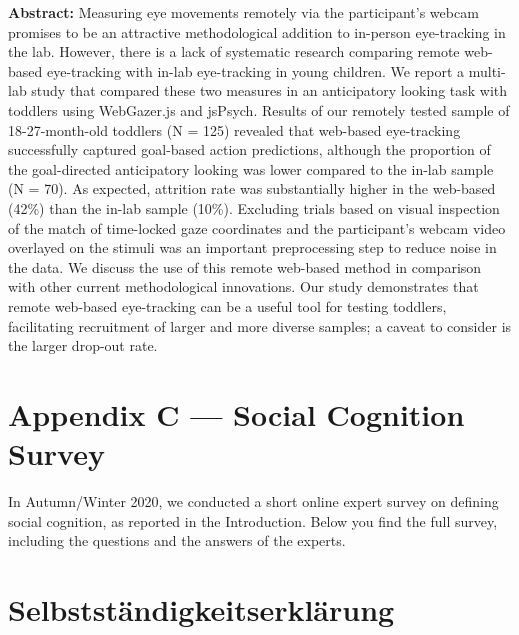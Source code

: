 \documentclass[
]{scrbook}
\begin{document}
\textbf{Abstract:} Measuring eye movements remotely via the participant's webcam promises to be an attractive methodological addition to in-person eye-tracking in the lab. However, there is a lack of systematic research comparing remote web-based eye-tracking with in-lab eye-tracking in young children. We report a multi-lab study that compared these two measures in an anticipatory looking task with toddlers using WebGazer.js and jsPsych. Results of our remotely tested sample of 18-27-month-old toddlers (N = 125) revealed that web-based eye-tracking successfully captured goal-based action predictions, although the proportion of the goal-directed anticipatory looking was lower compared to the in-lab sample (N = 70). As expected, attrition rate was substantially higher in the web-based (42\%) than the in-lab sample (10\%). Excluding trials based on visual inspection of the match of time-locked gaze coordinates and the participant's webcam video overlayed on the stimuli was an important preprocessing step to reduce noise in the data. We discuss the use of this remote web-based method in comparison with other current methodological innovations. Our study demonstrates that remote web-based eye-tracking can be a useful tool for testing toddlers, facilitating recruitment of larger and more diverse samples; a caveat to consider is the larger drop-out rate.

\chapter*{Appendix C --- Social Cognition Survey}\label{appendixC}

In Autumn/Winter 2020, we conducted a short online expert survey on defining social cognition, as reported in the Introduction. Below you find the full survey, including the questions and the answers of the experts.

\begin{minipage}{\textwidth}

\end{minipage}



\newpage

\chapter*{Selbstständigkeitserklärung}\label{selbststaendigkeit}
\end{document}

